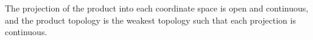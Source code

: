 The projection of the product into each coordinate space is open and continuous, and the product topology is the weakest topology such that each projection is continuous.
